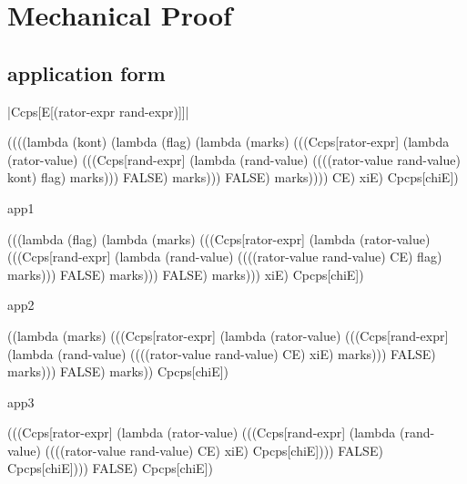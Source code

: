 \appendix
\chapter{Mechanical Proof}

\section{application form}

\noindent
\scheme|Ccps[E[(rator-expr rand-expr)]]|
\begin{schemeblock}
\begin{schemedisplay}
((((lambda (kont)
     (lambda (flag)
       (lambda (marks)
         (((Ccps[rator-expr]
                (lambda (rator-value)
                  (((Ccps[rand-expr]
                         (lambda (rand-value)
                           ((((rator-value rand-value) kont) flag) marks)))
                    FALSE) marks)))
           FALSE) marks))))
   CE) xiE) Cpcps[chiE])
\end{schemedisplay}
\end{schemeblock}

\noindent
app1

\begin{schemeblock}
\begin{schemedisplay}
(((lambda (flag)
    (lambda (marks)
      (((Ccps[rator-expr]
             (lambda (rator-value)
               (((Ccps[rand-expr]
                      (lambda (rand-value)
                        ((((rator-value rand-value) CE) flag) marks)))
                 FALSE) marks)))
        FALSE) marks)))
  xiE) Cpcps[chiE])
\end{schemedisplay}
\end{schemeblock}

\noindent
app2

\begin{schemeblock}
\begin{schemedisplay}
((lambda (marks)
   (((Ccps[rator-expr]
          (lambda (rator-value)
            (((Ccps[rand-expr]
                   (lambda (rand-value)
                     ((((rator-value rand-value) CE) xiE) marks)))
              FALSE) marks)))
     FALSE) marks)) Cpcps[chiE])
\end{schemedisplay}
\end{schemeblock}

\noindent
app3

\begin{schemeblock}
\begin{schemedisplay}
(((Ccps[rator-expr]
       (lambda (rator-value)
         (((Ccps[rand-expr]
                (lambda (rand-value)
                  ((((rator-value rand-value) CE) xiE) Cpcps[chiE])))
           FALSE) Cpcps[chiE])))
  FALSE) Cpcps[chiE])
\end{schemedisplay}
\end{schemeblock}

